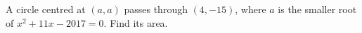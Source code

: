 A circle centred at $(a,a)$ passes through $(4,-15)$, where $a$ is the smaller root of $x^2+11x-2017=0$. Find its area.
